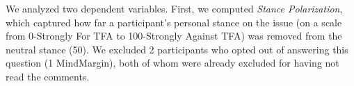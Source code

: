 
We analyzed two dependent variables.  First, we computed {\it Stance Polarization}, which captured how far a participant's personal stance on the issue (on a scale from 0-Strongly For TFA to 100-Strongly Against TFA) was removed from the neutral stance (50).  We excluded 2 participants who opted out of answering this question (1 MindMargin), both of whom were already excluded for having not read the comments.


